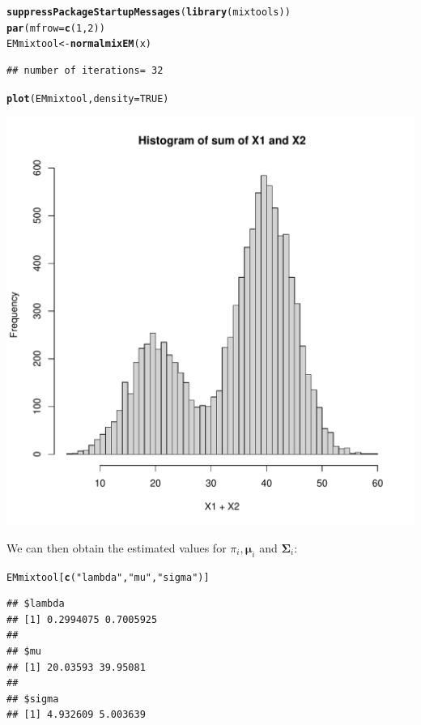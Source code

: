 \documentclass{article}\usepackage[]{graphicx}\usepackage[]{xcolor}
\makeatletter
\def\maxwidth{ %
  \ifdim\Gin@nat@width>\linewidth
    \linewidth
  \else
    \Gin@nat@width
  \fi
}
\newcommand{\hlnum}[1]{\textcolor[rgb]{0.686,0.059,0.569}{#1}}%
\newcommand{\hlstr}[1]{\textcolor[rgb]{0.192,0.494,0.8}{#1}}%
\newcommand{\hlstd}[1]{\textcolor[rgb]{0.345,0.345,0.345}{#1}}%
\newcommand{\hlkwb}[1]{\textcolor[rgb]{0.69,0.353,0.396}{#1}}%
\newcommand{\hlkwc}[1]{\textcolor[rgb]{0.333,0.667,0.333}{#1}}%
\newcommand{\hlkwd}[1]{\textcolor[rgb]{0.737,0.353,0.396}{\textbf{#1}}}%
\newenvironment{kframe}{%
 \def\at@end@of@kframe{}%
 \ifinner\ifhmode%
  \def\at@end@of@kframe{\end{minipage}}%
  \begin{minipage}{\columnwidth}%
 \fi\fi%
 \def\FrameCommand##1{\hskip\@totalleftmargin \hskip-\fboxsep
 \colorbox{shadecolor}{##1}\hskip-\fboxsep
     \hskip-\linewidth \hskip-\@totalleftmargin \hskip\columnwidth}%
 \MakeFramed {\advance\hsize-\width
   \@totalleftmargin\z@ \linewidth\hsize
   \@setminipage}}%
 {\par\unskip\endMakeFramed%
 \at@end@of@kframe}
\newenvironment{knitrout}{}{} %
\theoremstyle{plain}
\theoremstyle{definition}
\theoremstyle{remark}
\newcommand{\boldmu}{\boldsymbol{\mu}}
\newcommand{\boldSigma}{\boldsymbol{\Sigma}}
\makeatother
\begin{document}
\begin{knitrout}
\color{fgcolor}\begin{kframe}
\begin{alltt}
  \hlkwd{suppressPackageStartupMessages}\hlstd{(}\hlkwd{library}\hlstd{(mixtools))}
  \hlkwd{par}\hlstd{(}\hlkwc{mfrow}\hlstd{=}\hlkwd{c}\hlstd{(}\hlnum{1}\hlstd{,}\hlnum{2}\hlstd{))}
  \hlstd{EMmixtool} \hlkwb{<-} \hlkwd{normalmixEM}\hlstd{(x)}
\end{alltt}
\begin{verbatim}
## number of iterations= 32
\end{verbatim}
\begin{alltt}
  \hlkwd{plot}\hlstd{(EMmixtool,} \hlkwc{density}\hlstd{=}\hlnum{TRUE}\hlstd{)}
\end{alltt}
\end{kframe}

{\centering \includegraphics[width=\maxwidth]{figure/unnamed-chunk-3-1} 

}


\end{knitrout}
We can then obtain the estimated values for $\pi_i, \boldmu_i$ and $\boldSigma_i$:
\begin{knitrout}
\color{fgcolor}\begin{kframe}
\begin{alltt}
  \hlstd{EMmixtool[}\hlkwd{c}\hlstd{(}\hlstr{"lambda"}\hlstd{,} \hlstr{"mu"}\hlstd{,} \hlstr{"sigma"}\hlstd{)]}
\end{alltt}
\begin{verbatim}
## $lambda
## [1] 0.2994075 0.7005925
## 
## $mu
## [1] 20.03593 39.95081
## 
## $sigma
## [1] 4.932609 5.003639
\end{verbatim}
\end{kframe}
\end{knitrout}
\end{document}
